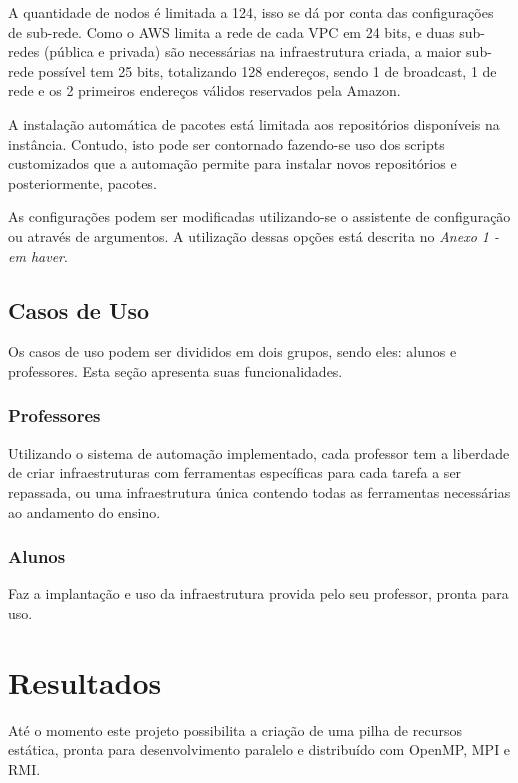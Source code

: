 \documentclass[tg]{mdtufsm}
\begin{document}
A quantidade de nodos é limitada a 124, isso se dá por conta das configurações de sub-rede. Como o AWS limita a rede de cada VPC em 24 bits, e duas sub-redes (pública e privada) são necessárias na infraestrutura criada, a maior sub-rede possível tem 25 bits, totalizando 128 endereços, sendo 1 de broadcast, 1 de rede e os 2 primeiros endereços válidos reservados pela Amazon.

A instalação automática de pacotes está limitada aos repositórios disponíveis na instância. Contudo, isto pode ser contornado fazendo-se uso dos scripts customizados que a automação permite para instalar novos repositórios e posteriormente, pacotes.

As configurações podem ser modificadas utilizando-se o assistente de configuração ou através de argumentos. A utilização dessas opções está descrita no \emph{Anexo 1 - em haver}.


\section{Casos de Uso}

Os casos de uso podem ser divididos em dois grupos, sendo eles: alunos e professores. Esta seção apresenta suas funcionalidades.

\subsection{Professores}

Utilizando o sistema de automação implementado, cada professor tem a liberdade de criar infraestruturas com ferramentas específicas para cada tarefa a ser repassada, ou uma infraestrutura única contendo todas as ferramentas necessárias ao andamento do ensino.

\subsection{Alunos}

Faz a implantação e uso da infraestrutura provida pelo seu professor, pronta para uso.


\chapter{Resultados}

Até o momento este projeto possibilita a criação de uma pilha de recursos estática, pronta para desenvolvimento paralelo e distribuído com OpenMP, MPI e RMI.
\end{document}
